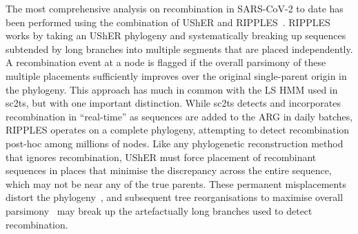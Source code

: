 \documentclass[12pt]{article}
\begin{document}
The most comprehensive analysis on recombination in SARS-CoV-2 to
date has been performed using the combination of UShER and
RIPPLES~\cite{Turakhia2022}.
RIPPLES works by taking an UShER phylogeny and systematically breaking up
sequences subtended by long branches into multiple segments
that are placed independently.
A recombination event at a node is flagged if
the overall parsimony of these multiple placements
sufficiently improves over
the original single-parent origin in the phylogeny.
This approach has much in common with the LS HMM
used in sc2ts, but with one important distinction.
While sc2ts detects and incorporates recombination
in ``real-time'' as sequences are added to the ARG in daily
batches, RIPPLES operates on a complete phylogeny,
attempting to detect recombination post-hoc among millions of nodes.
Like any phylogenetic reconstruction method
that ignores recombination, UShER must force placement of recombinant
sequences in places that minimise the discrepancy across the entire sequence,
which may not be near any of the true parents.
These permanent misplacements distort the phylogeny~\cite{Schierup2000consequences},
and subsequent tree reorganisations to maximise overall parsimony~\cite{DeMaio2023}
may break up the artefactually long branches used to detect recombination.
\end{document}
